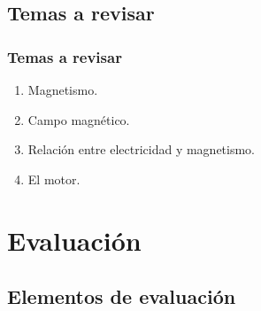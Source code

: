 \documentclass[14pt]{beamer}
\begin{document}
\subsection{Temas a revisar}

\begin{frame}
\frametitle{Temas a revisar}
\begin{enumerate}[<+->]
\item Magnetismo.
\item Campo magnético.
\item Relación entre electricidad y magnetismo.
\item El motor.
\end{enumerate}
\end{frame}

\section{Evaluación}
\subsection{Elementos de evaluación}
\end{document}
